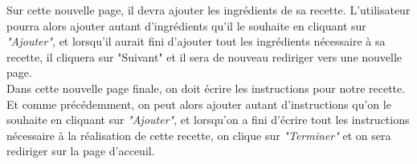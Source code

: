 \documentclass{article}
\begin{document}
Sur cette nouvelle page, il devra ajouter les ingrédients de sa recette. L’utilisateur pourra alors ajouter autant d’ingrédients qu’il le souhaite en cliquant sur \textit{"Ajouter"}, et lorsqu’il aurait fini d’ajouter tout les ingrédients nécessaire à sa recette, il cliquera sur "Suivant" et il sera de nouveau rediriger vers une nouvelle page.\\

Dans cette nouvelle page finale, on doit écrire les instructions pour notre recette. Et comme précédemment, on peut alors ajouter autant d’instructions qu’on le souhaite en cliquant sur \textit{"Ajouter"}, et lorsqu’on a fini d’écrire tout les instructions nécessaire à la réalisation de cette recette, on clique sur \textit{"Terminer"} et on sera rediriger sur la page d’acceuil.

\begin{figure}
    \centering
    \begin{tabular}{@{}c@{}}

\end{tabular}
\end{figure}
\end{document}
